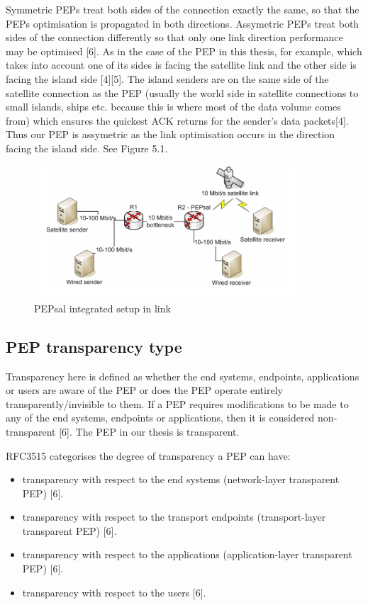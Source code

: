 \documentclass{uathesis}
\begin{document}
Symmetric PEPs treat both sides of the connection exactly the same, so that the PEPs optimisation is propagated in both directions. Assymetric PEPs treat both sides of the connection differently so that only one link direction performance may be optimised [6]. As in the case of the PEP in this thesis, for example, which takes into account one of its sides is facing the satellite link and the other side is facing the island side [4][5].  The island senders are on the same side of the satellite connection as the PEP (usually the world side in satellite connections to small islands, ships etc. because this is where most of the data volume comes from) which ensures the quickest ACK returns for the sender's data packets[4]. Thus our PEP is assymetric as the link optimisation occurs in the direction facing the island side. See Figure 5.1.  \\

\begin{figure}[h!]
    \centering
    \includegraphics[width=0.87\textwidth]{PEPsalSet.PNG}
    \caption{PEPsal integrated setup in link}
    \label{fig:PEPsal}
\end{figure}

\subsection{PEP transparency type}
Transparency here is defined as whether the end systems, endpoints, applications or users are aware of the PEP or does the PEP operate entirely transparently/invisible to them. If a PEP requires modifications to be made to any of the end systems, endpoints or applications, then it is considered non-transparent [6]. The PEP in our thesis is transparent.

RFC3515 categorises the degree of transparency a PEP can have:\\
\begin{itemize}
\item transparency with respect to the end systems (network-layer transparent PEP) [6].
\item transparency with respect to the transport endpoints (transport-layer transparent PEP) [6].
\item transparency with respect to the applications (application-layer transparent PEP) [6].
\item transparency with respect to the users [6].\\
\end{itemize}
\end{document}

